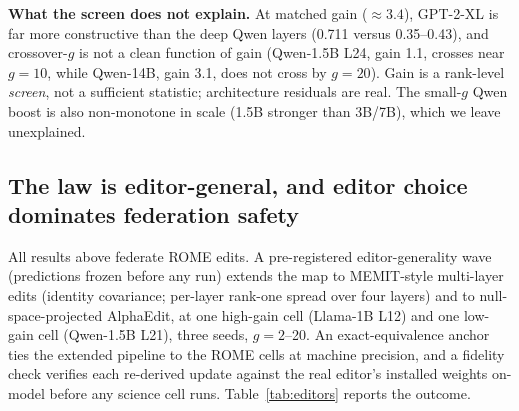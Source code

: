 \documentclass[preprint,12pt]{elsarticle}
\theoremstyle{definition}
\begin{document}
\textbf{What the screen does not explain.} At matched gain ($\approx3.4$), GPT-2-XL is far
more constructive than the deep Qwen layers (0.711 versus 0.35--0.43), and crossover-$g$ is
not a clean function of gain (Qwen-1.5B L24, gain 1.1, crosses near $g{=}10$, while Qwen-14B,
gain 3.1, does not cross by $g{=}20$). Gain is a rank-level \emph{screen}, not a sufficient
statistic; architecture residuals are real. The small-$g$ Qwen boost is also non-monotone in
scale (1.5B stronger than 3B/7B), which we leave unexplained.

\subsection{The law is editor-general, and editor choice dominates federation safety}
\label{sec:editors}
All results above federate ROME edits. A pre-registered editor-generality wave (predictions
frozen before any run) extends the map to MEMIT-style multi-layer edits (identity
covariance; per-layer rank-one spread over four layers) and to null-space-projected
AlphaEdit, at one high-gain cell (Llama-1B L12) and one low-gain cell (Qwen-1.5B L21), three
seeds, $g{=}2$--20. An exact-equivalence anchor ties the extended pipeline to the ROME cells
at machine precision, and a fidelity check verifies each re-derived update against the real
editor's installed weights on-model before any science cell runs. Table~\ref{tab:editors}
reports the outcome.
\end{document}
